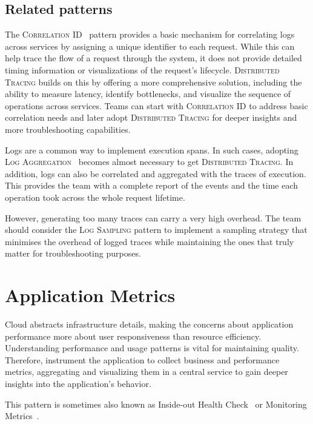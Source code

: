 \documentclass[runningheads]{llncs}
\begin{document}
\subsection{Related patterns}
The \textsc{Correlation ID}~\cite{Brown-Woolf-2016} pattern provides a basic mechanism for correlating logs across services by assigning a unique identifier to each request. While this can help trace the flow of a request through the system, it does not provide detailed timing information or visualizations of the request's lifecycle. \textsc{Distributed Tracing} builds on this by offering a more comprehensive solution, including the ability to measure latency, identify bottlenecks, and visualize the sequence of operations across services. Teams can start with \textsc{Correlation ID} to address basic correlation needs and later adopt \textsc{Distributed Tracing} for deeper insights and more troubleshooting capabilities.

Logs are a common way to implement execution spans. In such cases, adopting \textsc{Log Aggregation}~\cite{sousa2017engineering,sousa2025pattern} becomes almost necessary to get \textsc{Distributed Tracing}. In addition, logs can also be correlated and aggregated with the traces of execution. This provides the team with a complete report of the events and the time each operation took across the whole request lifetime.

However, generating too many traces can carry a very high overhead. The team should consider the \textsc{Log Sampling} pattern to implement a sampling strategy that minimises the overhead of logged traces while maintaining the ones that truly matter for troubleshooting purposes.


\section{Application Metrics}\label{pat:application-metrics} 

Cloud abstracts infrastructure details, making the concerns about application performance more about user responsiveness than resource efficiency. Understanding performance and usage patterns is vital for maintaining quality. Therefore, instrument the application to collect business and performance metrics, aggregating and visualizing them in a central service to gain deeper insights into the application's behavior.

This pattern is sometimes also known as Inside-out Health Check~\cite{Gupta-Patterns-2022} or Monitoring Metrics~\cite{Waseem-Practices-2021}.
\end{document}
